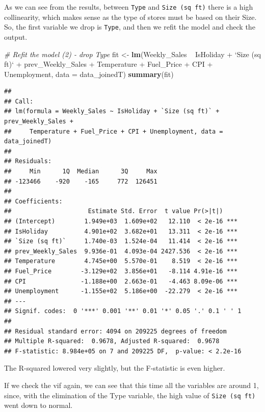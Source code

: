 \documentclass[11pt,]{article}
\newenvironment{Shaded}{\begin{snugshade}}{\end{snugshade}}
\newcommand{\KeywordTok}[1]{\textcolor[rgb]{0.13,0.29,0.53}{\textbf{{#1}}}}
\newcommand{\DataTypeTok}[1]{\textcolor[rgb]{0.13,0.29,0.53}{{#1}}}
\newcommand{\StringTok}[1]{\textcolor[rgb]{0.31,0.60,0.02}{{#1}}}
\newcommand{\CommentTok}[1]{\textcolor[rgb]{0.56,0.35,0.01}{\textit{{#1}}}}
\newcommand{\NormalTok}[1]{{#1}}
\begin{document}
As we can see from the results, between \texttt{Type} and
\texttt{Size\ (sq\ ft)} there is a high collinearity, which makes sense
as the type of stores must be based on their Size. So, the first
variable we drop is \texttt{Type}, and then we refit the model and check
the output.

\begin{Shaded}
\begin{Highlighting}[]
\CommentTok{# Refit the model (2) - drop Type}
\NormalTok{fit <-}\StringTok{ }\KeywordTok{lm}\NormalTok{(Weekly_Sales ~}\StringTok{ }\NormalTok{IsHoliday +}\StringTok{ `}\DataTypeTok{Size (sq ft)}\StringTok{`} \NormalTok{+}\StringTok{ }\NormalTok{prev_Weekly_Sales +}\StringTok{ }
\StringTok{    }\NormalTok{Temperature +}\StringTok{ }\NormalTok{Fuel_Price +}\StringTok{ }\NormalTok{CPI +}\StringTok{ }\NormalTok{Unemployment, }\DataTypeTok{data =} \NormalTok{data_joinedT)}
\KeywordTok{summary}\NormalTok{(fit)}
\end{Highlighting}
\end{Shaded}

\begin{verbatim}
## 
## Call:
## lm(formula = Weekly_Sales ~ IsHoliday + `Size (sq ft)` + prev_Weekly_Sales + 
##     Temperature + Fuel_Price + CPI + Unemployment, data = data_joinedT)
## 
## Residuals:
##     Min      1Q  Median      3Q     Max 
## -123466    -920    -165     772  126451 
## 
## Coefficients:
##                     Estimate Std. Error  t value Pr(>|t|)    
## (Intercept)        1.949e+03  1.609e+02   12.110  < 2e-16 ***
## IsHoliday          4.901e+02  3.682e+01   13.311  < 2e-16 ***
## `Size (sq ft)`     1.740e-03  1.524e-04   11.414  < 2e-16 ***
## prev_Weekly_Sales  9.936e-01  4.093e-04 2427.536  < 2e-16 ***
## Temperature        4.745e+00  5.570e-01    8.519  < 2e-16 ***
## Fuel_Price        -3.129e+02  3.856e+01   -8.114 4.91e-16 ***
## CPI               -1.188e+00  2.663e-01   -4.463 8.09e-06 ***
## Unemployment      -1.155e+02  5.186e+00  -22.279  < 2e-16 ***
## ---
## Signif. codes:  0 '***' 0.001 '**' 0.01 '*' 0.05 '.' 0.1 ' ' 1
## 
## Residual standard error: 4094 on 209225 degrees of freedom
## Multiple R-squared:  0.9678, Adjusted R-squared:  0.9678 
## F-statistic: 8.984e+05 on 7 and 209225 DF,  p-value: < 2.2e-16
\end{verbatim}

The R-squared lowered very slightly, but the F-statistic is even higher.

If we check the vif again, we can see that this time all the variables
are around 1, since, with the elimination of the Type variable, the high
value of \texttt{Size\ (sq\ ft)} went down to normal.
\end{document}
